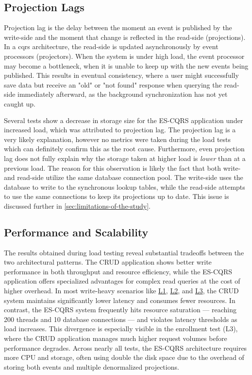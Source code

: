 \subsection{Projection Lags}
\label{sec:projection-lag}

Projection lag is the delay between the moment an event is published by the write-side and the moment that change is reflected in the read-side (projections). In a \gls{cqrs} architecture, the read-side is updated asynchronously by event processors (projectors). When the system is under high load, the event processor may become a bottleneck, when it is unable to keep up with the new events being published. This results in eventual consistency, where a user might successfully save data but receive an "old" or "not found" response when querying the read-side immediately afterward, as the background synchronization has not yet caught up.

Several tests show a decrease in storage size for the ES-CQRS application under increased load, which was attributed to projection lag. The projection lag is a very likely explanation, however no metrics were taken during the load tests which can definitely confirm this as the root cause. Furthermore, even projection lag does not fully explain why the storage taken at higher load is \emph{lower} than at a previous load. The reason for this observation is likely the fact that both write- and read-side utilize the same database connection pool. The write-side uses the database to write to the synchronous lookup tables, while the read-side attempts to use the same connections to keep its projections up to date. This issue is discussed further in \autoref{sec:limitations-of-the-study}.

\subsection{Performance and Scalability}
\label{sec:interpretation-performance}

The results obtained during load testing reveal substantial tradeoffs between the two architectural patterns. The CRUD application shows better write performance in both throughput and resource efficiency, while the ES-CQRS application offers specialized advantages for complex read queries at the cost of higher overhead. In most write-heavy scenarios like \hyperref[sec:l1]{L1}, \hyperref[sec:l2]{L2}, and \hyperref[sec:l2]{L3}, the CRUD system maintains significantly lower latency and consumes fewer resources. In contrast, the ES-CQRS system frequently hits resource saturation --- reaching 200 threads and 10 database connections --- and violates latency thresholds as load increases. This divergence is especially visible in the enrollment test (L3), where the CRUD application manages much higher request volumes before performance degrades. Across nearly all tests, the ES-CQRS architecture requires more CPU and storage, often using double the disk space due to the overhead of storing both events and multiple denormalized projections.

